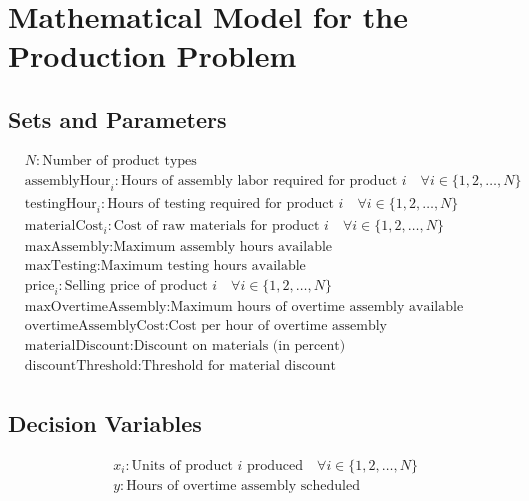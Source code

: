 \documentclass{article}
\begin{document}
\section*{Mathematical Model for the Production Problem}

\subsection*{Sets and Parameters}
\begin{align*}
& N: \text{Number of product types} \\
& \text{assemblyHour}_i: \text{Hours of assembly labor required for product } i \quad \forall i \in \{1, 2, \ldots, N\} \\
& \text{testingHour}_i: \text{Hours of testing required for product } i \quad \forall i \in \{1, 2, \ldots, N\} \\
& \text{materialCost}_i: \text{Cost of raw materials for product } i \quad \forall i \in \{1, 2, \ldots, N\} \\
& \text{maxAssembly}: \text{Maximum assembly hours available} \\
& \text{maxTesting}: \text{Maximum testing hours available} \\
& \text{price}_i: \text{Selling price of product } i \quad \forall i \in \{1, 2, \ldots, N\} \\
& \text{maxOvertimeAssembly}: \text{Maximum hours of overtime assembly available} \\
& \text{overtimeAssemblyCost}: \text{Cost per hour of overtime assembly} \\
& \text{materialDiscount}: \text{Discount on materials (in percent)} \\
& \text{discountThreshold}: \text{Threshold for material discount} \\
\end{align*}

\subsection*{Decision Variables}
\begin{align*}
& x_i: \text{Units of product } i \text{ produced} \quad \forall i \in \{1, 2, \ldots, N\} \\
& y: \text{Hours of overtime assembly scheduled} \\
\end{align*}
\end{document}
